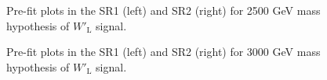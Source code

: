 \begin{figure}[H]
  \centering
  \caption{Pre-fit plots in the SR1 (left) and SR2 (right) for 2500 GeV mass hypothesis of $W'_{\text{L}}$ signal.}
  \label{fig:Prefit_WpLH2500_Asimov}
\end{figure}
\begin{figure}[H]
  \centering
  \caption{Pre-fit plots in the SR1 (left) and SR2 (right) for 3000 GeV mass hypothesis of $W'_{\text{L}}$ signal.}
  \label{fig:Prefit_WpLH3000_Asimov}
\end{figure}

